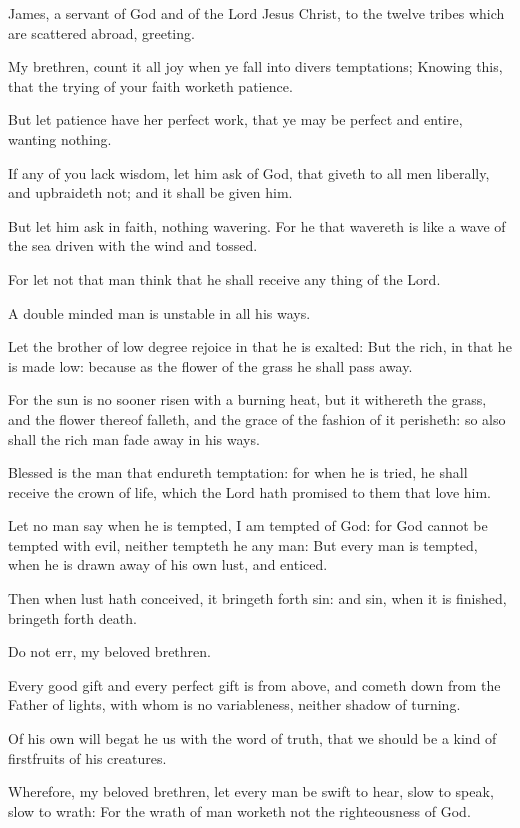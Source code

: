 \Chapter
\Verse James, a servant of God and of the Lord Jesus Christ, to the twelve tribes which are scattered abroad, greeting.

\Verse My brethren, count it all joy when ye fall into divers temptations; \Verse Knowing this, that the trying of your faith worketh patience.

\Verse But let patience have her perfect work, that ye may be perfect and entire, wanting nothing.

\Verse If any of you lack wisdom, let him ask of God, that giveth to all men liberally, and upbraideth not; and it shall be given him.

\Verse But let him ask in faith, nothing wavering. For he that wavereth is like a wave of the sea driven with the wind and tossed.

\Verse For let not that man think that he shall receive any thing of the Lord.

\Verse A double minded man is unstable in all his ways.

\Verse Let the brother of low degree rejoice in that he is exalted: \Verse But the rich, in that he is made low: because as the flower of the grass he shall pass away.

\Verse For the sun is no sooner risen with a burning heat, but it withereth the grass, and the flower thereof falleth, and the grace of the fashion of it perisheth: so also shall the rich man fade away in his ways.

\Verse Blessed is the man that endureth temptation: for when he is tried, he shall receive the crown of life, which the Lord hath promised to them that love him.

\Verse Let no man say when he is tempted, I am tempted of God: for God cannot be tempted with evil, neither tempteth he any man: \Verse But every man is tempted, when he is drawn away of his own lust, and enticed.

\Verse Then when lust hath conceived, it bringeth forth sin: and sin, when it is finished, bringeth forth death.

\Verse Do not err, my beloved brethren.

\Verse Every good gift and every perfect gift is from above, and cometh down from the Father of lights, with whom is no variableness, neither shadow of turning.

\Verse Of his own will begat he us with the word of truth, that we should be a kind of firstfruits of his creatures.

\Verse Wherefore, my beloved brethren, let every man be swift to hear, slow to speak, slow to wrath: \Verse For the wrath of man worketh not the righteousness of God.

